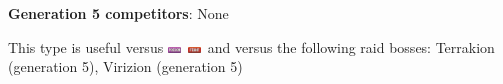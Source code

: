 \documentclass[8pt,aspectratio=169,compress]{beamer}
\newcommand{\fightingfull}{\includegraphics[height=0.15cm]{../../images/type/full/Fighting.png}}
\newcommand{\poisonfull}{\includegraphics[height=0.15cm]{../../images/type/full/Poison.png}}
\begin{document}
\begin{frame}
\begin{tiny}
\begin{block}{}
\begin{center}
\textbf{Generation 5 competitors}: None
\end{center}
\end{block}

\begin{block}{}\begin{center}
This type is useful versus \poisonfull~\fightingfull~and versus the following raid bosses: Terrakion (generation 5), Virizion (generation 5)
\end{center}
\end{block}

\end{tiny}
\end{frame}



\end{document}
